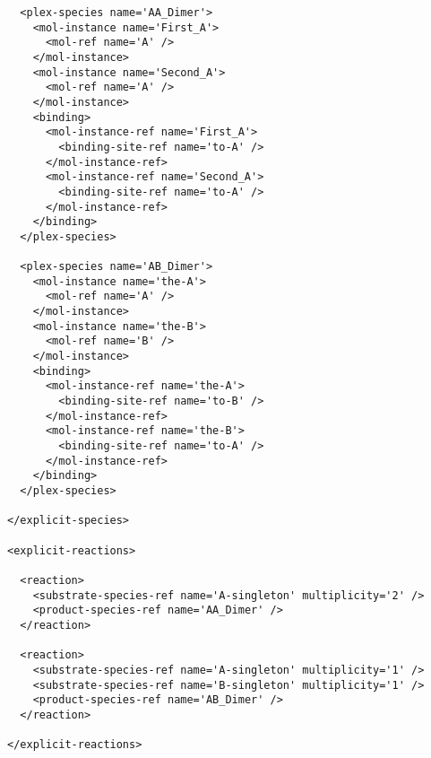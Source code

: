 \begin{lstlisting}
  <plex-species name='AA_Dimer'>
    <mol-instance name='First_A'>
      <mol-ref name='A' />
    </mol-instance>
    <mol-instance name='Second_A'>
      <mol-ref name='A' />
    </mol-instance>
    <binding>
      <mol-instance-ref name='First_A'>
        <binding-site-ref name='to-A' />
      </mol-instance-ref>
      <mol-instance-ref name='Second_A'>
        <binding-site-ref name='to-A' />
      </mol-instance-ref>
    </binding>
  </plex-species>

  <plex-species name='AB_Dimer'>
    <mol-instance name='the-A'>
      <mol-ref name='A' />
    </mol-instance>
    <mol-instance name='the-B'>
      <mol-ref name='B' />
    </mol-instance>
    <binding>
      <mol-instance-ref name='the-A'>
        <binding-site-ref name='to-B' />
      </mol-instance-ref>
      <mol-instance-ref name='the-B'>
        <binding-site-ref name='to-A' />
      </mol-instance-ref>
    </binding>
  </plex-species>

</explicit-species>

<explicit-reactions>

  <reaction>
    <substrate-species-ref name='A-singleton' multiplicity='2' />
    <product-species-ref name='AA_Dimer' />
  </reaction>

  <reaction>
    <substrate-species-ref name='A-singleton' multiplicity='1' />
    <substrate-species-ref name='B-singleton' multiplicity='1' />
    <product-species-ref name='AB_Dimer' />
  </reaction>

</explicit-reactions>  
\end{lstlisting}

